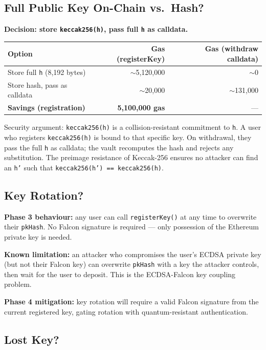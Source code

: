 \documentclass[11pt,a4paper]{article}
\begin{document}
\subsection{Full Public Key On-Chain vs.\ Hash?}

\textbf{Decision: store \texttt{keccak256(h)}, pass full \texttt{h} as calldata.}

\begin{center}
\begin{tabular}{lrr}
\toprule
\textbf{Option} & \textbf{Gas (registerKey)} & \textbf{Gas (withdraw calldata)} \\
\midrule
Store full \texttt{h} (8,192 bytes) & $\sim$5,120,000 & $\sim$0 \\
Store hash, pass as calldata & $\sim$20,000 & $\sim$131,000 \\
\midrule
\textbf{Savings (registration)} & \textbf{5,100,000 gas} & — \\
\bottomrule
\end{tabular}
\end{center}

Security argument: \texttt{keccak256(h)} is a collision-resistant commitment to \texttt{h}. A user who registers \texttt{keccak256(h)} is bound to that specific key. On withdrawal, they pass the full \texttt{h} as calldata; the vault recomputes the hash and rejects any substitution. The preimage resistance of Keccak-256 ensures no attacker can find an \texttt{h'} such that \texttt{keccak256(h') == keccak256(h)}.

\subsection{Key Rotation?}

\textbf{Phase 3 behaviour:} any user can call \texttt{registerKey()} at any time to overwrite their \texttt{pkHash}. No Falcon signature is required --- only possession of the Ethereum private key is needed.

\textbf{Known limitation:} an attacker who compromises the user's ECDSA private key (but not their Falcon key) can overwrite \texttt{pkHash} with a key the attacker controls, then wait for the user to deposit. This is the ECDSA-Falcon key coupling problem.

\textbf{Phase 4 mitigation:} key rotation will require a valid Falcon signature from the current registered key, gating rotation with quantum-resistant authentication.

\subsection{Lost Key?}
\end{document}
